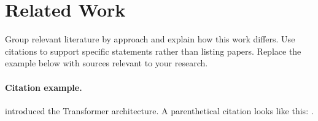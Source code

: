 \section{Related Work}
\label{sec:related}
Group relevant literature by approach and explain how this work differs.
Use citations to support specific statements rather than listing papers.
Replace the example below with sources relevant to your research.

\paragraph{Citation example.}
\citet{vaswani2017attention} introduced the Transformer architecture.
A parenthetical citation looks like this: \citep{vaswani2017attention}.
